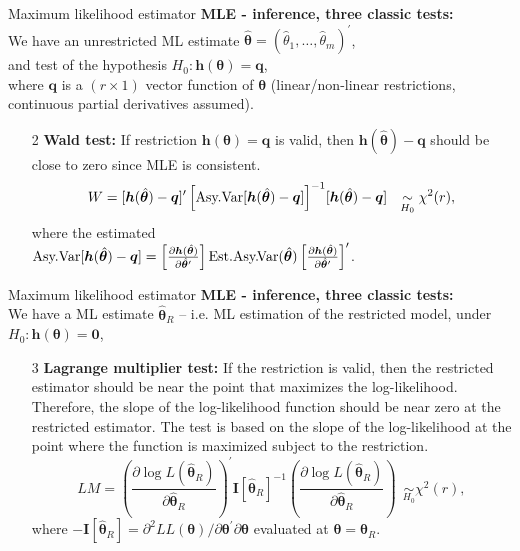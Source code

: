 \documentclass{beamer}
\begin{document}
\begin{frame}{Maximum likelihood estimator}
\textbf{MLE - inference, three classic tests:}\\ \bigskip
We have an unrestricted ML estimate $\hat{\bm{\theta}}=(\hat{\theta}_1, \dots, \hat{\theta}_m)^{\prime}$,\\
and test of the hypothesis $H_0 : \bm{h}(\bm{\theta}) = \bm{q}$,\\
where $\bm{q}$ is a $(r \times 1)$ vector function of $\bm{\theta}$ (linear/non-linear restrictions, continuous partial derivatives assumed).
\bigskip
\begin{itemize}
    \item[2] \textbf{Wald test:} If restriction $\bm{h}(\bm{\theta}) = \bm{q}$ is valid, then $\bm{h}(\hat{\bm{\theta}})-\bm{q}$ should be close to zero since MLE is consistent.\\
    $$
    W = [\bm{h}(\hat{\bm{\theta}})-\bm{q}]^{\prime}
    \left[  \textnormal{Asy.Var} [\bm{h}(\hat{\bm{\theta}})-\bm{q}]
    \right]^{-1} \! [\bm{h}(\hat{\bm{\theta}})-\bm{q}]
    ~~\underset{H_0}{\sim} \chi^2(r),
    $$
    where the estimated\\ $\textnormal{Asy.Var} [\bm{h}(\hat{\bm{\theta}})-\bm{q}]
    = \left[ \frac{\partial \bm{h}(\hat{\bm{\theta}})}{\partial \hat{\bm{\theta}}^{\prime}} 
    \right] \textnormal{Est.Asy.\!Var}(\hat{\bm{\theta}})
    \left[ \frac{\partial \bm{h}(\hat{\bm{\theta}})}{\partial \hat{\bm{\theta}}^{\prime}} 
    \right]^{\prime}$.
\end{itemize}
\end{frame}
\begin{frame}{Maximum likelihood estimator}
\textbf{MLE - inference, three classic tests:}\\ \bigskip
We have a ML estimate $\hat{\bm{\theta}}_R$ -- i.e. ML estimation of the restricted model, under $H_0 : \bm{h}(\bm{\theta}) = \bm{0}$,\\ \medskip
\begin{itemize}
    \item[3] \textbf{Lagrange multiplier test:} If the restriction is valid, then the restricted estimator should be near the point that maximizes the log-likelihood. Therefore, the slope of the log-likelihood function should be near zero at the restricted estimator. The test is based on the slope of the log-likelihood at the point where the function is maximized subject to the restriction.\\ \smallskip
    $$
    \textit{LM} = 
    \left( \frac{\partial \log L(\hat{\bm{\theta}}_R)}{\partial \hat{\bm{\theta}}_R} \right)^{\! \prime}
    \bm{I}[\hat{\bm{\theta}}_R]^{-1}
    \left( \frac{\partial \log L(\hat{\bm{\theta}}_R)}{\partial \hat{\bm{\theta}}_R} \right)
    ~~\underset{H_0}{\sim} \chi^2(r),
    $$
    where $-\bm{I}[\hat{\bm{\theta}}_R]= \partial^2 LL(\bm{\theta}) / \partial \bm{\theta}^{\prime} \partial \bm{\theta}$ evaluated at $\bm{\theta}=\hat{\bm{\theta}}_R$.
\end{itemize}

\end{frame}
\end{document}
